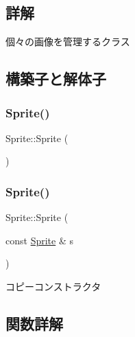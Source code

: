 \subsection{詳解}
個々の画像を管理するクラス 

\subsection{構築子と解体子}
\mbox{\label{class_sprite_a12cba3ac1868418add3c4d95ce87e615}} 
\subsubsection{\texorpdfstring{Sprite()}{Sprite()}\hspace{0.1cm}{\footnotesize\ttfamily [1/2]}}
{\footnotesize\ttfamily Sprite\+::\+Sprite (\begin{DoxyParamCaption}{ }\end{DoxyParamCaption})\hspace{0.3cm}{\ttfamily [inline]}}

\mbox{\label{class_sprite_a53252d3d5fbc5438ed6bbd8b3913c3b4}} 
\subsubsection{\texorpdfstring{Sprite()}{Sprite()}\hspace{0.1cm}{\footnotesize\ttfamily [2/2]}}
{\footnotesize\ttfamily Sprite\+::\+Sprite (\begin{DoxyParamCaption}\item[{const \mbox{\hyperlink{class_sprite}{Sprite}} \&}]{s }\end{DoxyParamCaption})\hspace{0.3cm}{\ttfamily [inline]}}



コピーコンストラクタ 



\subsection{関数詳解}
\mbox{\label{class_sprite_a86796a03be222a502397aa53a5207522}} 
